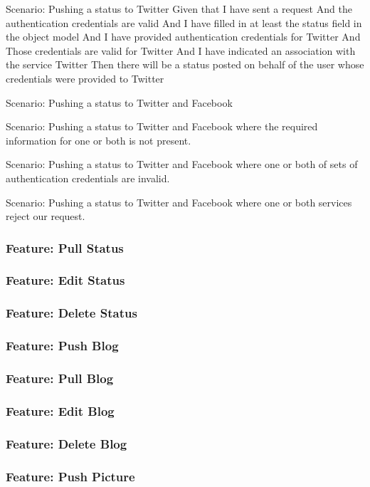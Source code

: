 \documentclass[12pt]{article}
\begin{document}
Scenario: Pushing a status to Twitter
	Given that I have sent a request
	And the authentication credentials are valid
	And I have filled in at least the status field in the object model
	And I have provided authentication credentials for Twitter
	And Those credentials are valid for Twitter
	And I have indicated an association with the service Twitter
	Then there will be a status posted on behalf of the user whose credentials 
	were provided to Twitter



Scenario: Pushing a status to Twitter and Facebook

Scenario: Pushing a status to Twitter and Facebook where the required 
information for one or both is not present.

Scenario: Pushing a status to Twitter and Facebook where one or both of sets of 
authentication credentials are invalid.

Scenario: Pushing a status to Twitter and Facebook where one or both services 
reject our request.


\subsubsection{Feature: Pull Status}
\subsubsection{Feature: Edit Status}
\subsubsection{Feature: Delete Status}

\subsubsection{Feature: Push Blog}
\subsubsection{Feature: Pull Blog}
\subsubsection{Feature: Edit Blog}
\subsubsection{Feature: Delete Blog}

\subsubsection{Feature: Push Picture}
\end{document}
